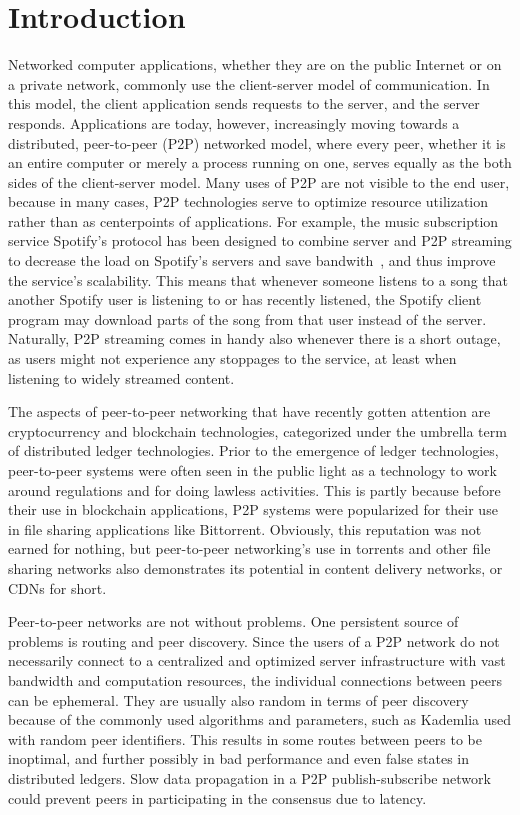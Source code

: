 \chapter{Introduction}
\label{Introduction}

Networked computer applications, whether they are on the public Internet or on a private network, commonly use the client-server model of communication. In this model, the client application sends requests to the server, and the server responds. Applications are today, however, increasingly moving towards a distributed, peer-to-peer (P2P) networked model, where every peer, whether it is an entire computer or merely a process running on one, serves equally as the both sides of the client-server model. Many uses of P2P are not visible to the end user, because in many cases, P2P technologies serve to optimize resource utilization rather than as centerpoints of applications. For example, the music subscription service Spotify's protocol has been designed to combine server and P2P streaming to decrease the load on Spotify's servers and save bandwith~\cite{Kreitz_undated-yp}, and thus improve the service's scalability. This means that whenever someone listens to a song that another Spotify user is listening to or has recently listened, the Spotify client program may download parts of the song from that user instead of the server. Naturally, P2P streaming comes in handy also whenever there is a short outage, as users might not experience any stoppages to the service, at least when listening to widely streamed content.

The aspects of peer-to-peer networking that have recently gotten attention are cryptocurrency and blockchain technologies, categorized under the umbrella term of distributed ledger technologies. Prior to the emergence of ledger technologies, peer-to-peer systems were often seen in the public light as a technology to work around regulations and for doing lawless activities. This is partly because before their use in blockchain applications, P2P systems were popularized for their use in file sharing applications like Bittorrent. Obviously, this reputation was not earned for nothing, but peer-to-peer networking's use in torrents and other file sharing networks also demonstrates its potential in content delivery networks, or CDNs for short.

Peer-to-peer networks are not without problems. One persistent source of problems is routing and peer discovery. Since the users of a P2P network do not necessarily connect to a centralized and optimized server infrastructure with vast bandwidth and computation resources, the individual connections between peers can be ephemeral. They are usually also random in terms of peer discovery because of the commonly used algorithms and parameters, such as Kademlia used with random peer identifiers. This results in some routes between peers to be inoptimal, and further possibly in bad performance and even false states in distributed ledgers. Slow data propagation in a P2P publish-subscribe network could prevent peers in participating in the consensus due to latency.

